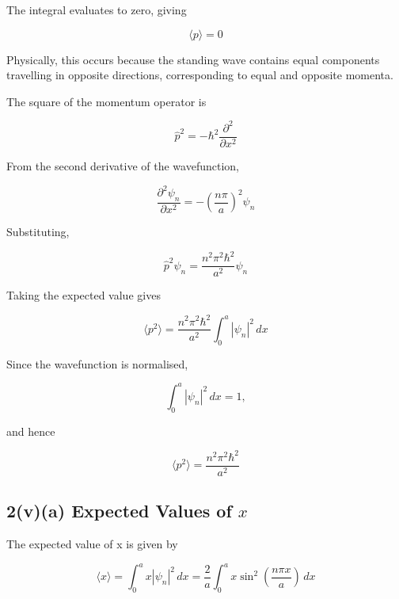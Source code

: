 \documentclass{article}
\begin{document}
The integral evaluates to zero, giving

\begin{equation*}
\boxed{\langle p\rangle=0}
\end{equation*}

Physically, this occurs because the standing wave contains equal
components travelling in opposite directions, corresponding to equal
and opposite momenta.

\vspace{1\baselineskip}

The square of the momentum operator is

\begin{equation*}
\hat{p}^2 = -\hbar^2\frac{\partial^2}{\partial x^2}
\end{equation*}

From the second derivative of the wavefunction,

\begin{equation*}
\frac{\partial^2\psi_n}{\partial x^2} = -\left(\frac{n\pi}{a}\right)^2\psi_n
\end{equation*}

Substituting,

\begin{equation*}
\hat{p}^2\psi_n = \frac{n^2\pi^2\hbar^2}{a^2}\psi_n
\end{equation*}

Taking the expected value gives

\begin{equation*}
\langle p^2\rangle = \frac{n^2\pi^2\hbar^2}{a^2} \int_0^a|\psi_n|^2\,dx
\end{equation*}

Since the wavefunction is normalised,

\begin{equation*}
\int_0^a|\psi_n|^2\,dx=1,
\end{equation*}

and hence

\begin{equation*}
\boxed{ \langle p^2\rangle = \frac{n^2\pi^2\hbar^2}{a^2}}
\end{equation*}


\subsection*{2(v)(a) Expected Values of $x$}

The expected value of x is given by

\begin{equation*}
\langle x\rangle = \int_0^a x|\psi_n|^2\,dx = \frac{2}{a} \int_0^a x\sin^2\left(\frac{n\pi x}{a}\right)\,dx
\end{equation*}
\end{document}
